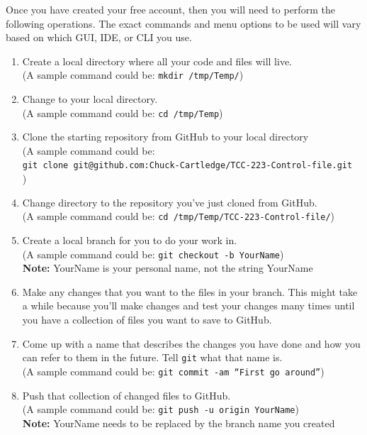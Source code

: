 Once you have created your free account, then you will need to perform the following operations.  The exact commands and menu options to be used will vary based on which GUI, IDE, or CLI you use.
\renewcommand{\MyTempCommand}[1]{\\(A sample command could be: \texttt{#1})}
\begin{enumerate}
\item Create a local directory where all your code and files will live. \MyTempCommand{mkdir /tmp/Temp/}
  \item Change to your local directory.  \MyTempCommand{cd /tmp/Temp}
  \item Clone the starting repository from GitHub to your local directory \MyTempCommand{\\git clone git@github.com:Chuck-Cartledge/TCC-223-Control-file.git\\}
    \item Change directory to the repository you've just cloned from GitHub.\MyTempCommand{cd /tmp/Temp/TCC-223-Control-file/}
\item Create a local branch for you to do your work in. \MyTempCommand{git checkout -b YourName}\\ \textbf{Note:} YourName is your personal name, not the string YourName
\item Make any changes that you want to the files in your branch.  This might take a while because you'll make changes and test your changes many times until you have a collection of files you want to save to GitHub.
\item Come up with a name that describes the changes you have done and how you can refer to them in the future.  Tell \texttt{git} what that name is. \MyTempCommand{git commit -am ``First go around''}
  \item Push that collection of changed files to GitHub. \MyTempCommand{git push -u origin YourName}\\ \textbf{Note:} YourName needs to be replaced by the branch name you created 
\end{enumerate}
